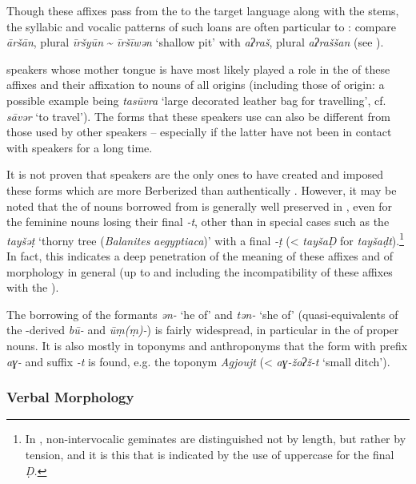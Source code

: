 \documentclass[output=paper]{langsci/langscibook}
\begin{document}
Though these affixes pass from the  to the target language along with the stems, the syllabic and vocalic patterns of such loans are often particular to : compare  \textit{āršān}, plural \textit{īršyūn} \~{} \textit{īršīwən} ‘shallow pit’ with  \textit{aʔraš}, plural \textit{aʔraššan} (see \citealt{Taine-Cheikh1997Zenaga}).

 speakers whose mother tongue is  have most likely played a role in the  of these affixes and their affixation to nouns of all origins (including those of  origin: a possible example being \textit{tasūvra} ‘large decorated leather bag for travelling’, cf. \textit{sāvər} ‘to travel’). The forms that these speakers use can also be different from those used by other  speakers – especially if the latter have not been in contact with  speakers for a long time. 

It is not proven that  speakers are the only ones to have created and imposed these forms which are more Berberized than authentically . However, it may be noted that the  of nouns borrowed from  is generally well preserved in , even for the feminine nouns losing their final \textit{{}-t}, other than in special cases such as the  \textit{tayšəṭ} ‘thorny tree (\textit{Balanites} \textit{aegyptiaca})’ with a final \textit{{}-ṭ} (<  \textit{tayšaḌ} for \textit{tayšaḍt}).\footnote{In , non-intervocalic geminates are distinguished not by length, but rather by tension, and it is this that is indicated by the use of uppercase for the final \textit{Ḍ.} } In fact, this indicates a deep penetration of the meaning of these affixes and of  morphology in general (up to and including the incompatibility of these affixes with the  ). 

The borrowing of the formants \textit{ən-} ‘he of’ and \textit{tən-} ‘she of’ (quasi-equivalents of the -derived \textit{bū-} and \textit{ūṃ(ṃ)-}) is fairly widespread, in particular in the  of proper nouns. It is also mostly in toponyms and anthroponyms that the  form with prefix \textit{aɣ-} and suffix \textit{{}-t} is found, e.g. the toponym \textit{Agjoujt} (< \textit{aɣ-žoʔž-t} ‘small ditch’).

\subsubsection{Verbal Morphology} %
\end{document}
